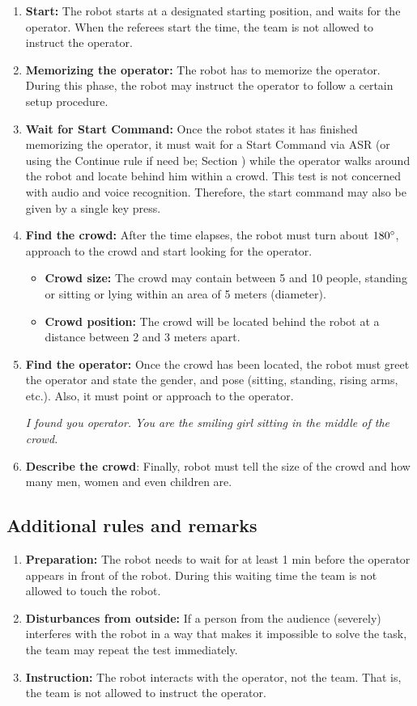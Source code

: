 \begin{enumerate}

\item \textbf{Start:} The robot starts at a designated starting position, and waits for the  operator. 
  When the referees start the time, the team is not allowed to instruct the operator.
\item \textbf{Memorizing the operator:} The robot has to memorize the operator. 
  During this phase, the robot may instruct the operator to follow a certain setup procedure.
\item \textbf{Wait for Start Command:} Once the robot states it has finished memorizing the operator, 
  it must wait for a Start Command via ASR (or using the Continue rule if need be; Section ) while the operator walks around the robot and locate behind him within a crowd.
  This test is not concerned with audio and voice recognition. Therefore, the start command may also be given by a single key press.
\item \textbf{Find the crowd:} After the time elapses, the robot must turn about $180\degree$, approach to the crowd and start looking for the operator.
\begin{itemize}
\item \textbf{Crowd size:} The crowd may contain between 5 and 10 people, standing or sitting or lying within an  area of 5 meters (diameter).
\item \textbf{Crowd position:} The crowd will be located behind the robot at a distance between 2 and 3 meters apart.
\end{itemize}
\item \textbf{Find the operator:} Once the crowd has been located, the robot must greet the operator and state the gender, and pose (sitting, standing, rising arms, etc.). Also, it must point or approach to the operator.

\textit{I found you operator. You are the smiling girl sitting in the middle of the crowd.}

\item \textbf{Describe the crowd}: Finally, robot must tell the size of the crowd and how many men, women and even children are.
\end{enumerate}

\subsection{Additional rules and remarks}
\begin{enumerate}
\item \textbf{Preparation:} The robot needs to wait for at least 1 min before the operator appears in front of the robot. During this waiting time the team is not allowed to touch the robot.
\item \textbf{Disturbances from outside:} If a person from the audience (severely) interferes with the robot in a way that makes it impossible to solve the task, the team may repeat the test immediately.
\item \textbf{Instruction:} The robot interacts with the operator, not the team. That is, the team is not allowed to instruct the operator.
\end{enumerate}


